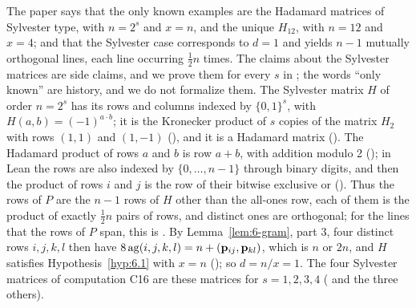 \begin{remark}
The paper says that the only known examples are the Hadamard matrices of Sylvester type, with
$n=2^s$ and $x=n$, and the unique $H_{12}$, with $n=12$ and $x=4$; and that the Sylvester case
corresponds to $d=1$ and yields $n-1$ mutually orthogonal lines, each line occurring $\frac12n$
times. The claims about the Sylvester matrices are side claims, and we prove them for every $s$
in ; the words ``only known'' are history, and we do
not formalize them. The Sylvester matrix $H$ of order $n=2^s$ has its rows and columns indexed by
$\{0,1\}^s$, with $H(a,b)=(-1)^{a\cdot b}$; it is the Kronecker product of $s$ copies of the
matrix $H_2$ with rows $(1,1)$ and $(1,-1)$ (), and
it is a Hadamard matrix (). The Hadamard product of rows $a$
and $b$ is row $a+b$, with addition modulo 2
(); in Lean the rows are also indexed
by $\{0,\dots,n-1\}$ through binary digits, and then the product of rows $i$ and $j$ is the row
of their bitwise exclusive or (). Thus
the rows of $P$ are the $n-1$ rows of $H$ other than the all-ones row, each of them is the
product of exactly $\frac12n$ pairs of rows, and distinct ones are orthogonal; for the lines
that the rows of $P$ span, this is . By Lemma~\ref{lem:6-gram},
part 3, four distinct rows $i,j,k,l$ then have $8\mathop{\mathrm{ag}}\nolimits(i,j,k,l)=n+({\mathbf p}_{ij},{\mathbf p}_{kl})$, which is
$n$ or $2n$, and $H$ satisfies Hypothesis~\ref{hyp:6.1} with $x=n$
(); so $d=n/x=1$. The four Sylvester matrices of
computation C16 are these matrices for $s=1,2,3,4$ ( and
the three others).
\end{remark}
\endgroup

